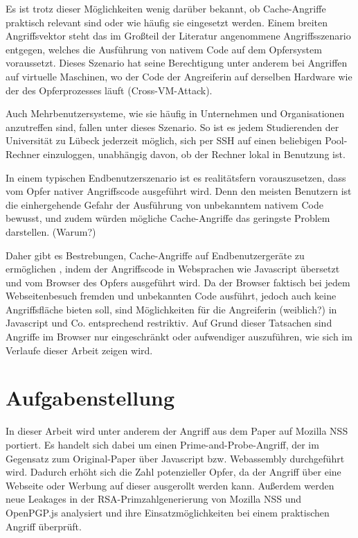 Es ist trotz dieser Möglichkeiten wenig darüber bekannt, ob Cache-Angriffe praktisch relevant sind oder wie häufig sie eingesetzt werden.
Einem breiten Angriffsvektor steht das im Großteil der Literatur angenommene Angriffsszenario entgegen, welches die Ausführung von nativem Code auf dem Opfersystem voraussetzt.
Dieses Szenario hat seine Berechtigung unter anderem bei Angriffen auf virtuelle Maschinen, wo der Code der Angreiferin auf derselben Hardware wie der des Opferprozesses läuft (Cross-VM-Attack).

Auch Mehrbenutzersysteme, wie sie häufig in Unternehmen und Organisationen anzutreffen sind, fallen unter dieses Szenario.
So ist es jedem Studierenden der Universität zu Lübeck jederzeit möglich, sich per SSH auf einen beliebigen Pool-Rechner einzuloggen, unabhängig davon, ob der Rechner lokal in Benutzung ist.

In einem typischen Endbenutzerszenario ist es realitätsfern vorauszusetzen, dass vom Opfer nativer Angriffscode ausgeführt wird.
Denn den meisten Benutzern ist die einhergehende Gefahr der Ausführung von unbekanntem nativem Code bewusst, und zudem würden mögliche Cache-Angriffe das geringste Problem darstellen. (Warum?)

Daher gibt es Bestrebungen, Cache-Angriffe auf Endbenutzergeräte zu ermöglichen \cite{TheSpyInTheSandbox,DriveByPaper,ASLROnTheLine}, indem der Angriffscode in Websprachen wie Javascript übersetzt und vom Browser des Opfers ausgeführt wird.
Da der Browser faktisch bei jedem Webseitenbesuch fremden und unbekannten Code ausführt, jedoch auch keine Angriffsfläche bieten soll, sind Möglichkeiten für die Angreiferin (weiblich?) in Javascript und Co. entsprechend restriktiv.
Auf Grund dieser Tatsachen sind Angriffe im Browser nur eingeschränkt oder aufwendiger auszuführen, wie sich im Verlaufe dieser Arbeit zeigen wird. 

\section{Aufgabenstellung}


In dieser Arbeit wird unter anderem der Angriff aus dem Paper \cite{RSAKeyGeneration2} auf Mozilla NSS portiert. Es handelt sich dabei um einen Prime-and-Probe-Angriff, der im Gegensatz zum Original-Paper über Javascript bzw. Webassembly durchgeführt wird. Dadurch erhöht sich die Zahl potenzieller Opfer, da der Angriff über eine Webseite oder Werbung auf dieser ausgerollt werden kann.
Außerdem werden neue Leakages in der RSA-Primzahlgenerierung von Mozilla NSS und OpenPGP.js analysiert und ihre Einsatzmöglichkeiten bei einem praktischen Angriff überprüft.

